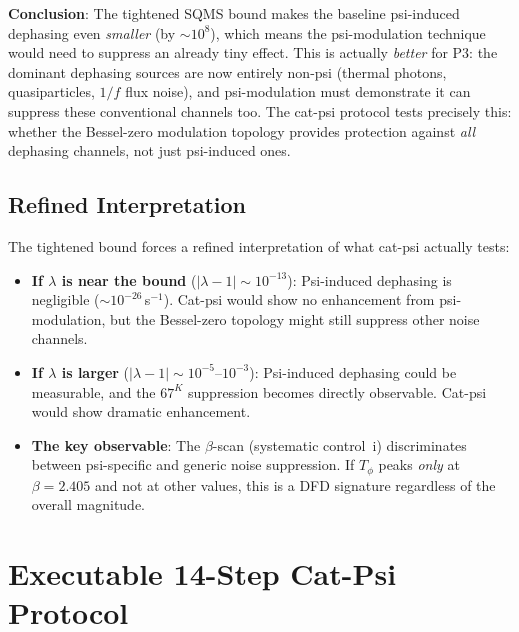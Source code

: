 \documentclass[11pt]{article}
\theoremstyle{definition}
\theoremstyle{remark}
\newcommand{\lamdiff}{|\lambda-1|}
\begin{document}
\begin{tcolorbox}[colback=green!5!white, colframe=green!70!black]
\textbf{Conclusion}: The tightened SQMS bound makes the baseline
psi-induced dephasing even \emph{smaller} (by $\sim 10^8$), which means
the psi-modulation technique would need to suppress an already tiny effect.
This is actually \emph{better} for P3: the dominant dephasing sources are
now entirely non-psi (thermal photons, quasiparticles, $1/f$ flux noise),
and psi-modulation must demonstrate it can suppress these conventional
channels too. The cat-psi protocol tests precisely this: whether the
Bessel-zero modulation topology provides protection against \emph{all}
dephasing channels, not just psi-induced ones.
\end{tcolorbox}

\subsection{Refined Interpretation}

The tightened bound forces a refined interpretation of what cat-psi
actually tests:

\begin{itemize}
\item \textbf{If $\lambda$ is near the bound} ($\lamdiff \sim 10^{-13}$):
  Psi-induced dephasing is negligible ($\sim 10^{-26}$\,s$^{-1}$).
  Cat-psi would show no enhancement from psi-modulation, but the
  Bessel-zero topology might still suppress other noise channels.
\item \textbf{If $\lambda$ is larger} ($\lamdiff \sim 10^{-5}$--$10^{-3}$):
  Psi-induced dephasing could be measurable, and the $67^K$ suppression
  becomes directly observable. Cat-psi would show dramatic enhancement.
\item \textbf{The key observable}: The $\beta$-scan (systematic control~i)
  discriminates between psi-specific and generic noise suppression. If
  $T_\phi$ peaks \emph{only} at $\beta = 2.405$ and not at other values,
  this is a DFD signature regardless of the overall magnitude.
\end{itemize}

\section{Executable 14-Step Cat-Psi Protocol}
\label{sec:protocol-deep}
\end{document}
